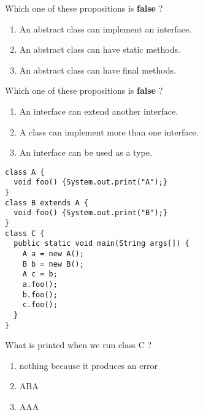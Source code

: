\documentclass[correction]{exercices}
\begin{document}
\begin{question}
Which one of these propositions is \textbf{false} ?
\begin{enumerate}
\item An abstract class can implement an interface.
\item An abstract class can have static methods.
\item An abstract class can have final methods.
\end{enumerate}
\end{question}

\begin{question}
Which one of these propositions is \textbf{false} ?
\begin{enumerate}
\item An interface can extend another interface.
\item A class can implement more than one interface.
\item An interface can be used as a type. 
\end{enumerate}
\end{question}

\begin{question}
\hfill

\begin{verbatim}
class A {
  void foo() {System.out.print("A");}
}
class B extends A {
  void foo() {System.out.print("B");}
}
class C {
  public static void main(String args[]) {
    A a = new A();
    B b = new B();
    A c = b;
    a.foo();
    b.foo();
    c.foo();
  }
}
\end{verbatim}

What is printed when we run class C ?
\begin{multicols}{2}
\begin{enumerate}
\item nothing because it produces an error
\item ABA
\item AAA
\end{enumerate}
\end{multicols}
\end{question}
\end{document}
